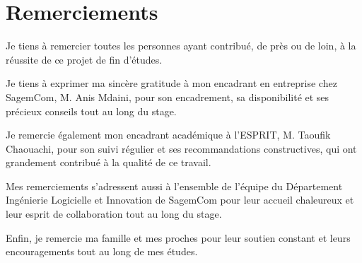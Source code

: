 \chapter*{Remerciements}

Je tiens à remercier toutes les personnes ayant contribué, de près ou de loin, à la réussite de ce projet de fin d'études.

Je tiens à exprimer ma sincère gratitude à mon encadrant en entreprise chez SagemCom, M. Anis Mdaini, pour son encadrement, sa disponibilité et ses précieux conseils tout au long du stage.

Je remercie également mon encadrant académique à l'ESPRIT, M. Taoufik Chaouachi, pour son suivi régulier et ses recommandations constructives, qui ont grandement contribué à la qualité de ce travail.

Mes remerciements s'adressent aussi à l'ensemble de l'équipe du Département Ingénierie Logicielle et Innovation de SagemCom pour leur accueil chaleureux et leur esprit de collaboration tout au long du stage.

Enfin, je remercie ma famille et mes proches pour leur soutien constant et leurs encouragements tout au long de mes études.

